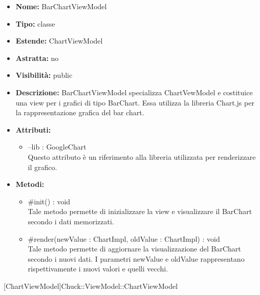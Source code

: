 			
			\begin{itemize}
			\item \textbf{Nome:} BarChartViewModel
			\item \textbf{Tipo:} classe
			
		\item \textbf{Estende:}
		ChartViewModel
		\item \textbf{Astratta:}
		no
			\item \textbf{Visibilità:} public
			\item \textbf{Descrizione:} BarChartViewModel specializza ChartVewModel e costituice una view per i grafici di tipo BarChart. Essa utilizza la libreria Chart.js per la rappresentazione grafica del bar chart.
			\item \textbf{Attributi:}
				\begin{itemize}
				\setlength{\itemsep}{5pt}
				
					\item[\ding{111}] {--lib : GoogleChart} \\ [1mm] Questo attributo è un riferimento alla libreria utilizzata per renderizzare il grafico.
				\end{itemize}
		
			\item \textbf{Metodi:}
				\begin{itemize}
				\setlength{\itemsep}{5pt}
				
					\item[\ding{111}] {{\#init() : void}} \\ [1mm] Tale metodo permette di inizializzare la view e visualizzare il BarChart secondo i dati memorizzati.
					\item[\ding{111}] {{\#render(newValue : ChartImpl, oldValue : ChartImpl) : void}} \\ [1mm] Tale metodo permette di aggiornare la visualizzazione del BarChart secondo i nuovi dati. I parametri newValue e oldValue rappresentano rispettivamente i nuovi valori e quelli vecchi.
				\end{itemize}
		
			\end{itemize}

			
			[ChartViewModel]{Chuck::ViewModel::ChartViewModel}
			

	
